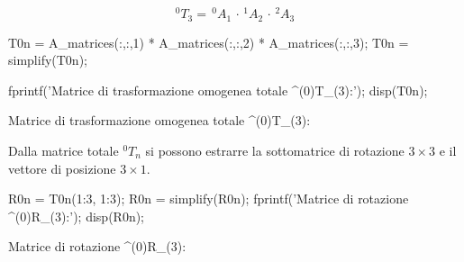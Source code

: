 \documentclass[11pt, a4paper]{article}
\begin{document}
\begin{par}
$$^0 T_3 = \,^0 A_1 \, \cdot \,{}^1 A_2 \, \cdot \,{}^{2} A_3$$
\end{par}

\begin{matlabcode}
T0n = A_matrices(:,:,1) * A_matrices(:,:,2) * A_matrices(:,:,3);
T0n = simplify(T0n);

fprintf('Matrice di trasformazione omogenea totale ^(0)T_(3):\n');
disp(T0n);
\end{matlabcode}
\begin{matlaboutput}
Matrice di trasformazione omogenea totale ^(0)T_(3):
\end{matlaboutput}
\begin{par}
\begin{flushleft}
Dalla matrice totale $^0 T_n$ si possono estrarre la sottomatrice di rotazione $3\times 3$ e il vettore di posizione $3\times 1$.
\end{flushleft}
\end{par}

\begin{matlabcode}
R0n = T0n(1:3, 1:3);
R0n = simplify(R0n);
fprintf('Matrice di rotazione ^(0)R_(3):\n');
disp(R0n);
\end{matlabcode}
\begin{matlaboutput}
Matrice di rotazione ^(0)R_(3):
\end{matlaboutput}
\end{document}
